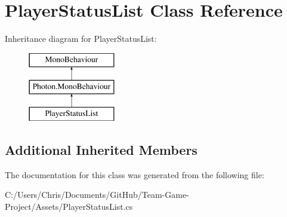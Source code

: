 \hypertarget{class_player_status_list}{}\section{Player\+Status\+List Class Reference}
\label{class_player_status_list}
Inheritance diagram for Player\+Status\+List\+:\begin{figure}[H]
\begin{center}
\leavevmode
\includegraphics[height=3.000000cm]{class_player_status_list}
\end{center}
\end{figure}
\subsection*{Additional Inherited Members}


The documentation for this class was generated from the following file\+:\begin{DoxyCompactItemize}
\item 
C\+:/\+Users/\+Chris/\+Documents/\+Git\+Hub/\+Team-\/\+Game-\/\+Project/\+Assets/Player\+Status\+List.\+cs\end{DoxyCompactItemize}
